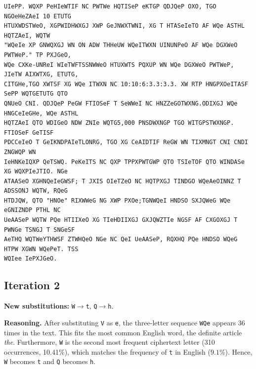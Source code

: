 \documentclass[11pt,a4paper]{article}
\begin{document}
\begin{lstlisting}[style=ciphertext,caption={Complete text after iteration 1}]
UIePP. WQXP PeHIeWTIF NC PWTWe HQTISeP eKTGP QDJQeP OXO, TGO NGOeHeZAeI 10 ETUTG
HTUXWDSTWeO, XGPWIDHWXGJ XWP GeJNWXTWNI, XG T HTASeIeTO AF WQe ASTHL HQTZAeI, WQTW
"WQeIe XP GNWQXGJ WN ON ADW THHeUW WQeITWXN UINUNPeO AF WQe DGXWeO PWTWeP." TP PXJGeO,
WQe CXKe-UNReI WIeTWFTSSNWWeO HTUXWTS PQXUP WN WQe DGXWeO PWTWeP, JIeTW AIXWTXG, ETUTG,
CITGHe,TGO XWTSF XG WQe ITWXN NC 10:10:6:3.3:3.3. XW RTP HNGPXOeITASF SePP WQTGETUTG QTO
QNUeO CNI. QDJQeP PeGW FTIOSeF T SeWWeI NC HNZZeGOTWXNG.ODIXGJ WQe HNGCeIeGHe, WQe ASTHL
HQTZAeI QTO WDIGeO NDW ZNIe WQTG5,000 PNSDWXNGP TGO WITGPSTWXNGP. FTIOSeF GeTISF
PDCCeIeO T GeIKNDPAIeTLONRG, TGO XG CeAIDTIF ReGW WN TIXMNGT CNI CNDI ZNGWQP WN
IeHNKeIQXP QeTSWQ. PeKeITS NC QXP TPPXPWTGWP QTO TSIeTOF QTO WINDASe XG WQXPIeJTIO. NGe
ATAASeO XGHNQeIeGWSF; T JXIS OIeTZeO NC HQTPXGJ TINDGO WQeAeOINNZ T ADSSONJ WQTW, RQeG
HTDJQW, QTO "HNOe" RIXWWeG NG XWP PXOe;TGNWQeI HNDSO SXJQWeG WQe eGNIZNDP PTHL NC
UeAASeP WQTW PQe HTIIXeO XG TIeHDIIXGJ GXJQWZTIe NGSF AF CXGOXGJ T PWNGe TSNGJ T SNGeSF
AeTHQ WQTWeYTHWSF ZTWHQeO NGe NC QeI UeAASeP, RQXHQ PQe HNDSO WQeG HTPW XGWN WQePeT. TSS
WQIee IePXJGeO.
\end{lstlisting}

\newpage
\subsection{Iteration 2}

\noindent\textbf{New substitutions:} \texttt{W}$\rightarrow$\texttt{t}, \texttt{Q}$\rightarrow$\texttt{h}.\par
\smallskip
\noindent\textbf{Reasoning.} After substituting \texttt{V} as \texttt{e}, the three-letter sequence \texttt{WQe} appears 36 times in the text. This fits the most common English word, the definite article \textit{the}. Furthermore, \texttt{W} is the second most frequent ciphertext letter (310 occurrences, 10.41\%), which matches the frequency of \texttt{t} in English ($9.1\%$). Hence, \texttt{W} becomes \texttt{t} and \texttt{Q} becomes \texttt{h}.
\end{document}
